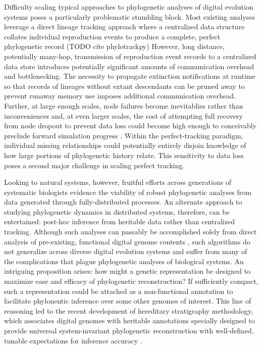 Difficulty scaling typical approaches to phylogenetic analyses of digital evolution systems poses a particularly problematic stumbling block.
Most existing analyses leverage a direct lineage tracking approach where a centralized data structure collates individual reproduction events to produce a complete, perfect phylogenetic record (TODO cite phylotrackpy)
However, long distance, potentially many-hop, transmission of reproduction event records to a centralized data store introduces potentially significant amounts of communication overhead and bottlenecking.
The necessity to propagate extinction notifications at runtime so that records of lineages without extant descendants can be pruned away to prevent runaway memory use imposes additional communication overhead.
Further, at large enough scales, node failures become inevitablies rather than inconveniences and, at even larger scales, the cost of attempting full recovery from node dropout to prevent data loss could become high enough to conceivably preclude forward simulation progress \citep{cappello2014toward}.
Within the perfect-tracking paradigm, individual missing relationships could potentially entirely disjoin knowledge of how large portions of phylogenetic history relate.
This sensitivity to data loss poses a second major challenge in scaling perfect tracking.

Looking to natural systems, however, fruitful efforts across generations of systematic biologists evidence the viability of robust phylogenetic analyses from data generated through fully-distributed processes.
An alternate approach to studying phylogenetic dynamics in distributed systems, therefore, can be entertained: post-hoc inference from heritable data rather than centralized tracking.
Although such analyses can passably be accomplished solely from direct analysis of pre-existing, functional digital genome contents \citep{moreno2021case}, such algorithms do not generalize across diverse digital evolution systems and suffer from many of the complications that plague phylogenetic analyses of biological systems.
An intriguing proposition arises: how might a genetic representation be designed to maximize ease and efficacy of phylogenetic reconstruction?
If sufficiently compact, such a representation could be attached as a non-functional annotation to facilitate phylonentic inference over some other genomes of interest.
This line of reasoning led to the recent development of hereditary stratigraphy methodology, which associates digital genomes with heritable annotations specially designed to provide universal system-invariant phylogenetic reconstruction with well-defined, tunable expectations for inference accuracy
\citep{moreno2022hereditary}.

